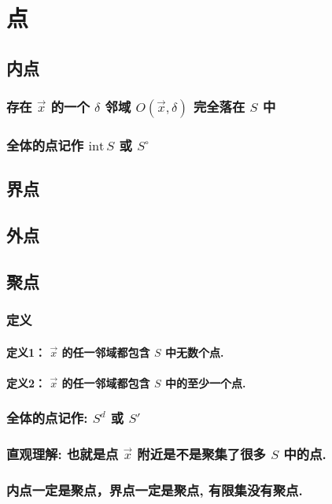 \documentclass[lang=cn]{ztex}
\begin{document}
\section{点}
\subsection{内点}
\subsubsection{存在 $\vec{x}$ 的一个 $\delta$ 邻域 $O(\vec{x}, \delta)$ 完全落在 $S$ 中}
\subsubsection{全体的点记作 $\mathrm{int}\, S$ 或 $S^\circ$}


\subsection{界点}
\subsection{外点}
\subsection{聚点}
    \subsubsection{定义}
        \paragraph{定义1： $\vec{x}$ 的任一邻域都包含 $S$ 中无数个点.}
        \paragraph{定义2： $\vec{x}$ 的任一邻域都包含 $S$ 中的至少一个点.}
    \subsubsection{全体的点记作: $S^d$ 或 $S'$}
    \subsubsection{直观理解: 也就是点 $\vec{x}$ 附近是不是聚集了很多 $S$ 中的点.}
    \subsubsection{内点一定是聚点，界点一定是聚点, 有限集没有聚点.}
\end{document}
